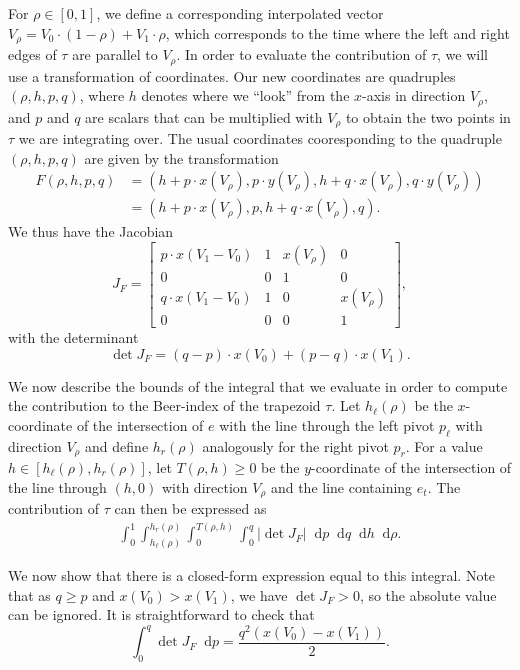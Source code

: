 \documentclass{article}
\newcommand*\diff{\mathop{}\!\mathrm{d}}
\begin{document}
For $\rho\in[0,1]$, we define a corresponding interpolated vector $V_\rho=V_0\cdot (1-\rho)+V_1\cdot \rho$, which corresponds to the time where the left and right edges of $\tau$ are parallel to $V_\rho$.
In order to evaluate the contribution of $\tau$, we will use a transformation of coordinates.
Our new coordinates are quadruples $(\rho,h,p,q)$, where $h$ denotes where we ``look'' from the $x$-axis in direction $V_\rho$, and $p$ and $q$ are scalars that can be multiplied with $V_\rho$ to obtain the two points in $\tau$ we are integrating over.
The usual coordinates cooresponding to the quadruple $(\rho,h,p,q)$ are given by the transformation
\begin{align*}
F(\rho,h,p,q) & = (h+p\cdot x(V_\rho),p\cdot y(V_\rho),h+q\cdot x(V_\rho),q\cdot y(V_\rho)) \\
& = (h+p\cdot x(V_\rho),p,h+q\cdot x(V_\rho),q).
\end{align*}
We thus have the Jacobian
\[
J_F =
\begin{bmatrix}
p\cdot x(V_1-V_0) & 1 & x(V_\rho) & 0 \\
0 & 0 & 1 & 0 \\
q\cdot x(V_1-V_0) & 1 & 0 & x(V_\rho) \\
0 & 0 & 0 & 1
\end{bmatrix},
\]
with the determinant
\[
\det J_F =
(q-p)\cdot x(V_0) + (p-q)\cdot x(V_1).
\]

We now describe the bounds of the integral that we evaluate in order to compute the contribution to the Beer-index of the trapezoid $\tau$.
Let $h_\ell(\rho)$ be the $x$-coordinate of the intersection of $e$ with the line through the left pivot $p_\ell$ with direction $V_\rho$ and define $h_r(\rho)$ analogously for the right pivot $p_r$.
For a value $h\in[h_\ell(\rho),h_r(\rho)]$, let $T(\rho,h)\geq 0$ be the $y$-coordinate of the intersection of the line through $(h,0)$ with direction $V_\rho$ and the line containing $e_t$.
The contribution of $\tau$ can then be expressed as
\begin{align}
\int_0^1
\int_{h_\ell(\rho)}^{h_r(\rho)}
\int_0^{T(\rho,h)}
\int_0^{q}
\left\vert \det J_F\right\vert \diff p \diff q \diff h \diff\rho. \label{eq:int4}
\end{align}

We now show that there is a closed-form expression equal to this integral.
Note that as $q\geq p$ and $x(V_0)> x(V_1)$, we have $\det J_F> 0$, so the absolute value can be ignored.
It is straightforward to check that
\[
\int_0^{q} \det J_F \diff p = \frac{q^2(x(V_0) - x(V_1))}2.
\]
\end{document}
